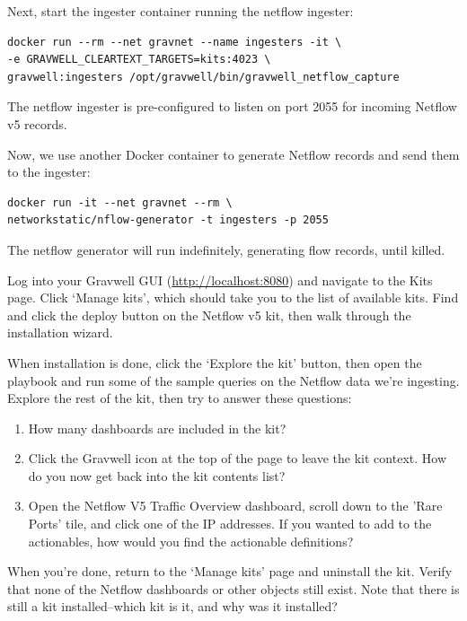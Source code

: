 Next, start the ingester container running the netflow ingester:

\begin{Verbatim}[breaklines=true]
docker run --rm --net gravnet --name ingesters -it \
-e GRAVWELL_CLEARTEXT_TARGETS=kits:4023 \
gravwell:ingesters /opt/gravwell/bin/gravwell_netflow_capture
\end{Verbatim}

The netflow ingester is pre-configured to listen on port 2055 for
incoming Netflow v5 records.

Now, we use another Docker container to generate Netflow records and
send them to the ingester:

\begin{Verbatim}[breaklines=true]
docker run -it --net gravnet --rm \
networkstatic/nflow-generator -t ingesters -p 2055
\end{Verbatim}

The netflow generator will run indefinitely, generating flow records,
until killed.

Log into your Gravwell GUI (\href{http://localhost:8080}{http://localhost:8080}) and navigate to the Kits page. Click `Manage kits', which should take you to the list of available kits. Find and click the deploy button on the Netflow v5 kit, then walk through the installation wizard.

When installation is done, click the `Explore the kit' button, then open the playbook and run some of the sample queries on the Netflow data we're ingesting. Explore the rest of the kit, then try to answer these questions:

\begin{enumerate}
\item
	How many dashboards are included in the kit?
\item
	Click the Gravwell icon at the top of the page to leave the kit context. How do you now get back into the kit contents list?
\item
	Open the Netflow V5 Traffic Overview dashboard, scroll down to the 'Rare Ports' tile, and click one of the IP addresses. If you wanted to add to the actionables, how would you find the actionable definitions?
\end{enumerate}

When you're done, return to the `Manage kits' page and uninstall the kit. Verify that none of the Netflow dashboards or other objects still exist. Note that there is still a kit installed--which kit is it, and why was it installed?


